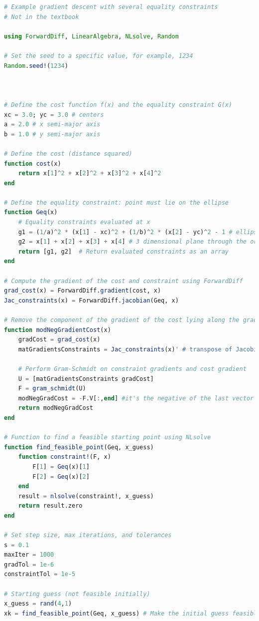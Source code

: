 \begin{lstlisting}[language=Julia,style=mystyle]
# Example gradient descent with several equality constraints
# Not in the textbook

using ForwardDiff, LinearAlgebra, NLsolve, Random

# Set the seed to a specific value, for example, 1234
Random.seed!(1234)



# Define the cost function f(x) and the equality constraint G(x)
xc = 3.0; yc = 3.0 # centers
a = 2.0 # x semi-major axis
b = 1.0 # y semi-major axis

# Define the cost (distance squared)
function cost(x)
    return x[1]^2 + x[2]^2 + x[3]^2 + x[4]^2
end

# Define the equality constraint: point must lie on the ellipse
function Geq(x)
    # Equality constraints evaluated at x
    g1 = (1/a)^2 * (x[1] - xc)^2 + (1/b)^2 * (x[2] - yc)^2 - 1 # ellipse in R4
    g2 = x[1] + x[2] + x[3] + x[4] # 3 dimensional plane through the origin
    return [g1, g2]  # Return evaluated constraints as an array
end

# Compute the gradient of the cost and constraint using ForwardDiff
grad_cost(x) = ForwardDiff.gradient(cost, x)
Jac_constraints(x) = ForwardDiff.jacobian(Geq, x)

# Remove the component of the gradient of the cost lying along the gradient of the constraints
function modNegGradientCost(x)
    gradCost = grad_cost(x)
    matGradientsConstraints = Jac_constraints(x)' # transpose of Jacobian for constraint gradients
    
    # Perform Gram-Schmidt on constraint gradients and cost gradient
    U = [matGradientsConstraints gradCost]
    F = gram_schmidt(U)
    modNegGradCost = -F.V[:,end] #it's the negative of the last vector in the matrix when doing Gradient Descent 
    return modNegGradCost
end

# Function to find a feasible starting point using NLsolve
function find_feasible_point(Geq, x_guess)
    function constraint!(F, x)
        F[1] = Geq(x)[1]
        F[2] = Geq(x)[2]
    end
    result = nlsolve(constraint!, x_guess)
    return result.zero
end

# Set step size, max iterations, and tolerances
s = 0.1
maxIter = 1000
gradTol = 1e-6
constraintTol = 1e-5

# Starting guess (not feasible initially)
x_guess = rand(4,1)
xk = find_feasible_point(Geq, x_guess) # Make the initial guess feasible


\end{lstlisting}

